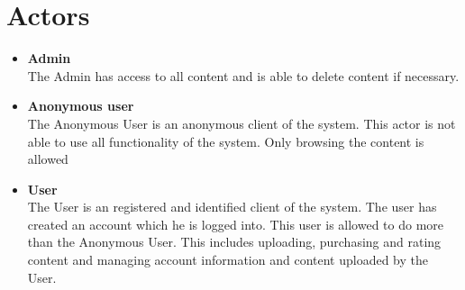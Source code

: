 \documentclass[../report.tex]{subfiles}
\begin{document}
\section{Actors}
\begin{itemize}
\item \textbf{Admin} \\
The Admin has access to all content and is able to delete content if necessary. 
\item \textbf{Anonymous user}\\ 
The Anonymous User is an anonymous client of the system. This actor is not able to use all functionality of the system. Only browsing the content is allowed
\item \textbf{User} \\
The User is an registered and identified client of the system. The user has created an account which he is logged into. This user is allowed to do more than the Anonymous User. This includes uploading, purchasing and rating content and managing account information and content uploaded by the User.
\end{itemize}
\end{document}
